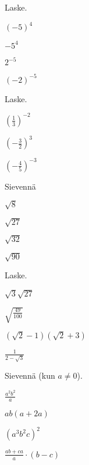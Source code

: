 
\begin{tehtava}
Laske.
\begin{kohdat}
\item \((-5)^4\)
\item \(-5^4\)
\item \(2^{-5}\)
\item \((-2)^{-5}\)
\end{kohdat}
\end{tehtava}

\begin{tehtava}
Laske.
\begin{kohdat}
\item \(\displaystyle \left(\frac{1}{3}\right)^{-2}\)
\item \(\displaystyle\left(-\frac{3}{2}\right)^{3}\)
\item \(\displaystyle\left(-\frac{4}{5}\right)^{-3}\)
\end{kohdat}
\end{tehtava}

\begin{tehtava}
Sievennä
\begin{kohdat}
\item \(\sqrt{8}\)
\item \(\sqrt{27}\)
\item \(\sqrt{32}\)
\item \(\sqrt{90}\)
\end{kohdat}
\end{tehtava}

\begin{tehtava}
Laske.
\begin{kohdat}
\item \(\sqrt{3}\sqrt{27}\)
\item \(\displaystyle \sqrt{\frac{49}{100}}\)
\item \(\left(\sqrt{2} - 1\right)\left(\sqrt{2} + 3\right)\)
\item \(\displaystyle \frac{1}{2-\sqrt{3}}\)
\end{kohdat}
\end{tehtava}

\begin{tehtava}
Sievennä (kun $a \neq 0$).
\begin{kohdat}
\item \(\displaystyle \frac{a^2 b^2}{a}\)
\item \(ab(a+2a)\)
\item \((a^3 b^2 c)^2\)
\item \(\displaystyle \frac{ab+ca}{a} \cdot (b-c)\)
\end{kohdat}
\end{tehtava}

